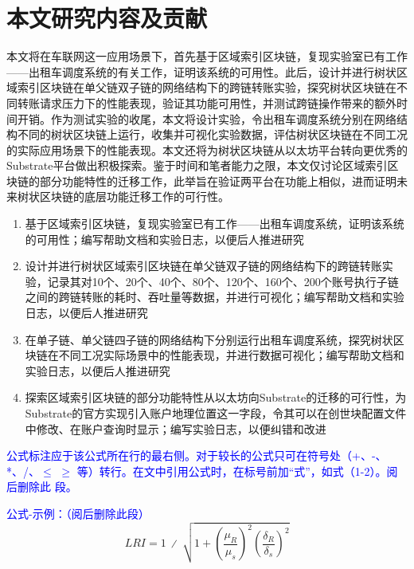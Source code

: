 \section{本文研究内容及贡献}

本文将在车联网这一应用场景下，首先基于区域索引区块链，复现实验室已有工作——出租车调度系统的有关工作，证明该系统的可用性。此后，设计并进行树状区域索引区块链在单父链双子链的网络结构下的跨链转账实验，探究树状区块链在不同转账请求压力下的性能表现，验证其功能可用性，并测试跨链操作带来的额外时间开销。作为测试实验的收尾，本文将设计实验，令出租车调度系统分别在网络结构不同的树状区块链上运行，收集并可视化实验数据，评估树状区块链在不同工况的实际应用场景下的性能表现。本文还将为树状区块链从以太坊平台转向更优秀的Substrate平台做出积极探索。鉴于时间和笔者能力之限，本文仅讨论区域索引区块链的部分功能特性的迁移工作，此举旨在验证两平台在功能上相似，进而证明未来树状区块链的底层功能迁移工作的可行性。

\begin{enumerate}
  \item 基于区域索引区块链，复现实验室已有工作——出租车调度系统，证明该系统的可用性；编写帮助文档和实验日志，以便后人推进研究
  \item 设计并进行树状区域索引区块链在单父链双子链的网络结构下的跨链转账实验，记录其对10个、20个、40个、80个、120个、160个、200个账号执行子链之间的跨链转账的耗时、吞吐量等数据，并进行可视化；编写帮助文档和实验日志，以便后人推进研究
  \item 在单子链、单父链四子链的网络结构下分别运行出租车调度系统，探究树状区块链在不同工况实际场景中的性能表现，并进行数据可视化；编写帮助文档和实验日志，以便后人推进研究
  \item 探索区域索引区块链的部分功能特性从以太坊向Substrate的迁移的可行性，为Substrate的官方实现引入账户地理位置这一字段，令其可以在创世块配置文件中修改、在账户查询时显示；编写实验日志，以便纠错和改进
\end{enumerate}


\textcolor{blue}{公式标注应于该公式所在行的最右侧。对于较长的公式只可在符号处（+、-、*、/、$\leqslant$ $\geqslant$ 等）转行。在文中引用公式时，在标号前加“式”，如式（1-2）。阅后删除此
  段。}

\textcolor{blue}{公式-示例：（阅后删除此段）}
\begin{equation}
  LRI=1\ ∕\ \sqrt{1+{\left(\frac{{\mu }_{R}}{{\mu }_{s}}\right)}^{2}{\left(\frac{{\delta }_{R}}{{\delta }_{s}}\right)}^{2}}
\end{equation}





